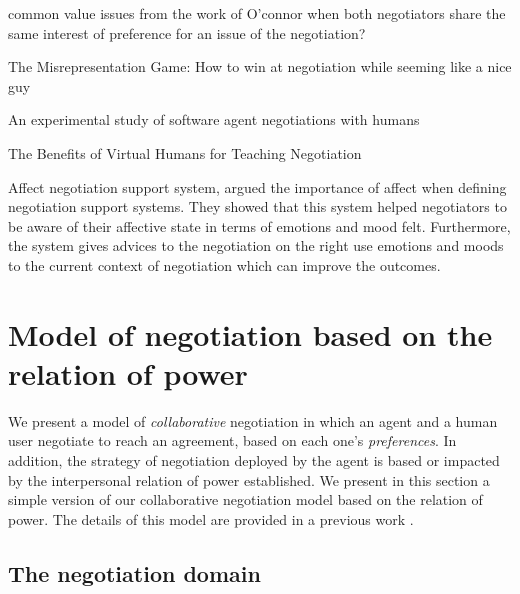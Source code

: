 \documentclass[runningheads,a4paper]{llncs}
\begin{document}
			common value issues from the work of O'connor when both negotiators share the same interest of preference for an issue of the negotiation?
		
			The Misrepresentation Game: How to win at negotiation \cite{gratch2016misrepresentation}
			\cite{vahidov2014experimental,gratch2016benefits}
			while seeming like a nice guy 
		
		An experimental study of software agent negotiations with humans
			
			The Benefits of Virtual Humans for Teaching Negotiation
			
			
			 Affect negotiation support system, argued the importance of affect when defining negotiation support systems. They showed that this system helped negotiators to be aware of their affective state in terms of emotions and mood felt. Furthermore, the system gives advices to the negotiation on the right use emotions and moods to the current context of negotiation which can improve the outcomes.
			

	
	\section{Model of negotiation based on the relation of power}
	We present a model of \textit{collaborative} negotiation in which an agent and a human user negotiate to reach an agreement, based on each one's \textit{preferences}. In addition, the strategy of negotiation deployed by the agent is based or impacted by the interpersonal relation of power established.
	We present in this section a simple version of our collaborative negotiation model based on the relation of power. The details of this model are  provided in a previous work \cite{ouali2017computational}.
	\subsection{The negotiation domain}
	
\end{document}
